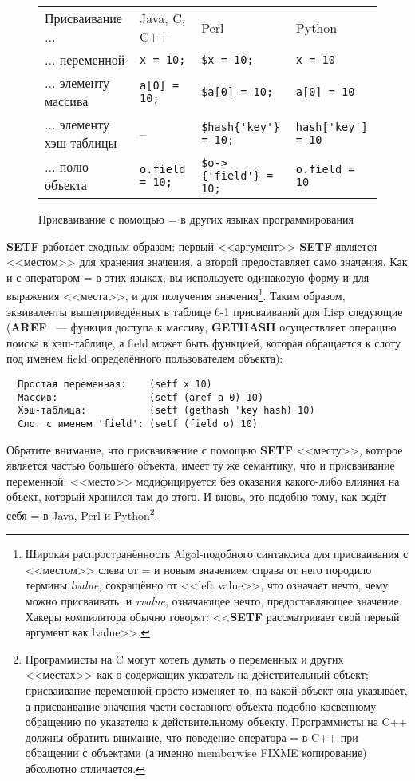 \begin{figure}[tb]
\begin{tabular}{|>{\centering}m{25mm}|>{\centering}m{25mm}|>{\centering}m{25mm}|>{\centering}m{25mm}|}
Присваивание ...         & Java, C, C++        & Perl                & Python \\
... переменной           & \lstinline!x = 10;! & \lstinline!$x = 10;! & \lstinline!x = 10! \\
... элементу массива     & \lstinline!a[0] = 10;! & \lstinline!$a[0] = 10;! & \lstinline!a[0] = 10! \\
... элементу хэш-таблицы & --                  & \lstinline!$hash{'key'} = 10;!  & \lstinline!hash['key'] = 10! \\
... полю объекта         & \lstinline!o.field = 10;! & \lstinline!$o->{'field'} = 10;! & \lstinline!o.field = 10! 
\end{tabular}
  \caption{Присваивание с помощью = в других языках программирования} 
  \label{table:06-1}
\end{figure}


\textbf{SETF} работает сходным образом: первый <<аргумент>> \textbf{SETF}
является <<местом>> для хранения значения, а второй предоставляет само значения. Как и с оператором = в этих
языках, вы используете одинаковую форму и для выражения <<места>>, и для получения
значения\footnote{Широкая распространённость Algol-подобного синтаксиса для присваивания с
  <<местом>> слева от = и новым значением справа от него породило термины \textit{lvalue},
  сокращённо от <<left value>>, что означает нечто, чему можно присваивать, и
  \textit{rvalue}, означающее нечто, предоставляющее значение. Хакеры компилятора обычно
  говорят: <<\textbf{SETF} рассматривает свой первый аргумент как lvalue>>.}. Таким образом,
эквиваленты вышеприведённых в таблице 6-1 присваиваний для Lisp следующие (\textbf{AREF}
~--- функция доступа к массиву, \textbf{GETHASH} осуществляет операцию поиска в
хэш-таблице, а field может быть функцией, которая обращается к слоту под именем field
определённого пользователем объекта):

\begin{verbatim}
  Простая переменная:    (setf x 10) 
  Массив:                (setf (aref a 0) 10)
  Хэш-таблица:           (setf (gethash 'key hash) 10)
  Слот с именем 'field': (setf (field o) 10)
\end{verbatim}

Обратите внимание, что присваиваение с помощью \textbf{SETF} <<месту>>, которое является
частью большего объекта, имеет ту же семантику, что и присваивание переменной: <<место>>
модифицируется без оказания какого-либо влияния на объект, который хранился там до
этого. И вновь, это подобно тому, как ведёт себя = в Java, Perl и
Python\footnote{Программисты на C могут хотеть думать о переменных и других <<местах>> как о
  содержащих указатель на действительный объект; присваивание переменной просто изменяет
  то, на какой объект она указывает, а присваивание значения части составного объекта
  подобно косвенному обращению по указателю к действительному объекту. Программисты на C++
  должны обратить внимание, что поведение оператора = в C++ при обращении с объектами (а
  именно memberwise FIXME копирование) абсолютно отличается.}.

